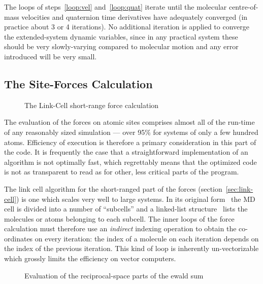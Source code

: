 \documentclass[a4paper,twoside]{report}
\begin{document}
The loops of steps~\ref{loop:vel} and~\ref{loop:quat} iterate until
the molecular centre-of-mass velocities and quaternion time
derivatives have adequately converged (in practice about 3 or 4
iterations).  No additional iteration is applied to converge the
extended-system dynamic variables, since in any practical system these
should be very slowly-varying compared to molecular motion and any
error introduced will be very small.

\subsection{The Site-Forces Calculation}

\begin{figure}[tb]
\noindent

\caption{The Link-Cell short-range force calculation}
\label{fig:link-cell}
\end{figure}

The evaluation of the forces on atomic sites comprises almost all of
the run-time of any reasonably sized simulation --- over 95\% for
systems of only a few hundred atoms.  Efficiency of execution is
therefore a primary consideration in this part of the code.  It is
frequently the case that a straightforward implementation of an
algorithm is not optimally fast, which regrettably means that
the optimized code is not as transparent to read as for other, less
critical parts of the program.

The link cell algorithm for the short-ranged part of the forces
(section~\ref{sec:link-cell}) is one which scales very well to large
systems.  In its original form~\cite{quentrec:75} the MD cell is
divided into a number of ``subcells'' and a linked-list
structure~\cite{knuth:73a} lists the molecules or atoms belonging to
each subcell.  The inner loops of the force calculation must therefore
use an \emph{indirect} indexing operation to obtain the co-ordinates
on every iteration: the index of a molecule on each iteration depends
on the index of the previous iteration.  This kind of loop is
inherently un-vectorizable which grossly limits the efficiency on
vector computers.  

\begin{figure}[tb]
\noindent

\caption{Evaluation of the reciprocal-space parts of the ewald sum}
\label{fig:ewald}
\end{figure}
\end{document}
